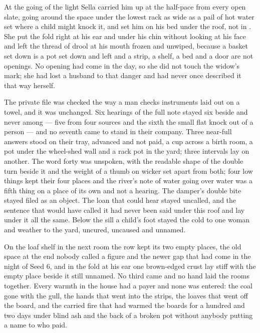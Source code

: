 \scenebreak

At the going of the light Sella carried him up  at the half-pace from every open slate, going around the space under the lowest rack as wide as a pail of hot water set where a child might knock it, and set him on his bed under the  roof, not in . She put the fold right at his ear and under his chin without looking at his face and left the thread of drool at his mouth frozen and unwiped, because a basket set down is a pot set down and left and a strip, a shelf, a bed and a door are not openings. No opening had come in the day, so she did not touch the widow's mark; she had lost a husband to that danger and had never once described it that way herself.

The private file was checked the way a man checks instruments laid out on a towel, and it was unchanged. Six hearings of the full note stayed six beside and never among --- five from four sources and the sixth the small flat knock out of a person --- and no seventh came to stand in their company. Three near-full answers stood on their tray, advanced and not paid, a cup across a birth room, a pot under the wheel-shed wall and a rack pot in the yard; three intervals lay on another. The word forty was unspoken, with the readable shape of the double turn beside it and the weight of a thumb on wicker set apart from both; four low things kept their four places and the river's note of water going over water was a fifth thing on a place of its own and not a hearing. The damper's double bite stayed filed as an object. The loan that could hear stayed uncalled, and the sentence that would have called it had never been said under this roof and lay under it all the same. Below the sill a child's foot stayed the cold to one woman and weather to the yard, uncured, uncaused and unnamed.

On the loaf shelf in the next room the row kept its two empty places, the old space at the end nobody called a figure and the newer gap that had come in the night of Seed 6, and in the fold at his ear one brown-edged crust lay stiff with the empty place beside it still unnamed. No third came and no hand laid the rooms together. Every warmth in the house had a payer and none was entered: the coal gone with the gull, the hands that went into the strips, the loaves that went off the board, and the carried fire that had warmed the boards for a hundred and two days under blind ash and the back of a broken pot without anybody putting a name to who paid.

